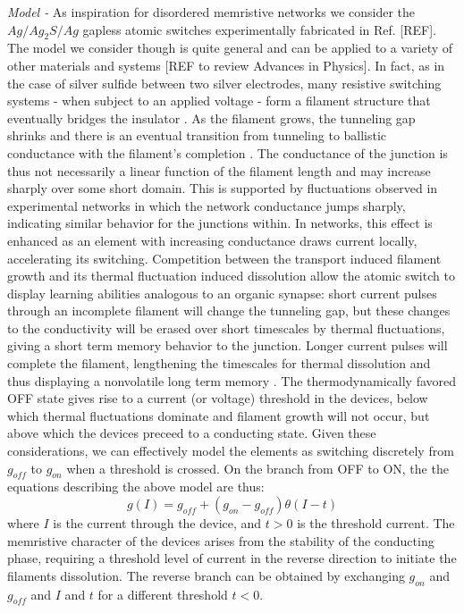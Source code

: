 \documentclass[aps,prl,reprint,groupedaddress]{revtex4-1}
\begin{document}
{\it Model -} As inspiration for disordered memristive networks we consider
the $Ag/Ag_2 S/Ag$ gapless atomic switches experimentally fabricated in
Ref. [REF]. The model we consider though is quite general and can be applied
to a variety of other materials and systems [REF to review Advances in
Physics]. In fact, as in the case of silver sulfide between two silver
electrodes, many resistive switching systems - when subject to an applied
voltage - form a filament structure that eventually
bridges the insulator \cite{Xu2010}. As the filament grows, the
tunneling gap shrinks and there is an eventual transition from tunneling
to ballistic conductance with the filament's completion
\cite{Hasegawa2010, Sun2014}. The conductance of the junction is thus not
necessarily a linear function of the filament length and may increase sharply
over some short domain. This is supported by fluctuations observed in
experimental networks in which the network conductance jumps sharply,
indicating similar behavior for the junctions within. In networks, this effect is enhanced as an element
with increasing conductance draws current locally, accelerating its
switching. Competition between the transport induced
filament growth and its thermal fluctuation induced dissolution allow the
atomic switch to display learning abilities analogous to an organic synapse:
short current pulses through an incomplete filament will change the tunneling
gap, but these changes to the conductivity will be erased over short timescales
by thermal fluctuations, giving a short term memory behavior to the junction.
Longer current pulses will complete the filament, lengthening the timescales
for thermal dissolution and thus displaying a nonvolatile long term memory
\cite{Hasegawa2010, Ohno2011}. The thermodynamically favored OFF state gives
rise to a current (or voltage) threshold in the devices, below which thermal
fluctuations dominate and filament growth will not occur, but above which the
devices preceed to a conducting state. Given these considerations, we can
effectively model the elements as switching discretely from $g_{off}$ to
$g_{on}$ when a threshold is crossed.  On the branch from OFF to ON, the
the equations describing the above model are thus:
\begin{equation}
g(I) = g_{off} + (g_{on} - g_{off})\theta (I - t)
\end{equation}
where $I$ is the current through the device, and $t>0$ is the threshold
current. The memristive character of the devices
arises from the stability of the conducting phase, requiring a threshold level
of current in the reverse direction to initiate the filaments dissolution.
The reverse branch can be obtained by exchanging $g_{on}$ and $g_{off}$ and
$I$ and $t$ for a different threshold $t<0$.
\end{document}
